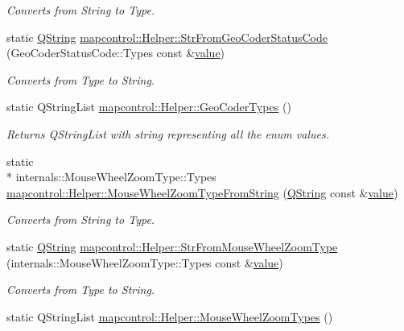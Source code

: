 \begin{DoxyCompactItemize}
\begin{DoxyCompactList}\small\item\em Converts from String to Type. \end{DoxyCompactList}\item 
static \hyperlink{group___u_a_v_objects_plugin_gab9d252f49c333c94a72f97ce3105a32d}{Q\-String} \hyperlink{group___o_p_map_widget_ga8641f35e4dcfdeb18e53899718555abb}{mapcontrol\-::\-Helper\-::\-Str\-From\-Geo\-Coder\-Status\-Code} (Geo\-Coder\-Status\-Code\-::\-Types const \&\hyperlink{glext_8h_aa0e2e9cea7f208d28acda0480144beb0}{value})
\begin{DoxyCompactList}\small\item\em Converts from Type to String. \end{DoxyCompactList}\item 
static Q\-String\-List \hyperlink{group___o_p_map_widget_ga461898c6bdb8fe425dc78ff470a9867a}{mapcontrol\-::\-Helper\-::\-Geo\-Coder\-Types} ()
\begin{DoxyCompactList}\small\item\em Returns Q\-String\-List with string representing all the enum values. \end{DoxyCompactList}\item 
static \\*
internals\-::\-Mouse\-Wheel\-Zoom\-Type\-::\-Types \hyperlink{group___o_p_map_widget_gab829c562d2443c5ffbe2c7d4b7071712}{mapcontrol\-::\-Helper\-::\-Mouse\-Wheel\-Zoom\-Type\-From\-String} (\hyperlink{group___u_a_v_objects_plugin_gab9d252f49c333c94a72f97ce3105a32d}{Q\-String} const \&\hyperlink{glext_8h_aa0e2e9cea7f208d28acda0480144beb0}{value})
\begin{DoxyCompactList}\small\item\em Converts from String to Type. \end{DoxyCompactList}\item 
static \hyperlink{group___u_a_v_objects_plugin_gab9d252f49c333c94a72f97ce3105a32d}{Q\-String} \hyperlink{group___o_p_map_widget_ga66a0a97a25bc6f0c8e79a87e466a04b2}{mapcontrol\-::\-Helper\-::\-Str\-From\-Mouse\-Wheel\-Zoom\-Type} (internals\-::\-Mouse\-Wheel\-Zoom\-Type\-::\-Types const \&\hyperlink{glext_8h_aa0e2e9cea7f208d28acda0480144beb0}{value})
\begin{DoxyCompactList}\small\item\em Converts from Type to String. \end{DoxyCompactList}\item 
static Q\-String\-List \hyperlink{group___o_p_map_widget_ga445f36c5148af8c77ebdf64269134267}{mapcontrol\-::\-Helper\-::\-Mouse\-Wheel\-Zoom\-Types} ()

\end{DoxyCompactItemize}
